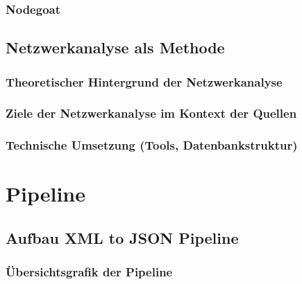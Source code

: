 \documentclass[12pt, a4paper, ngerman, bidi=default]{article}
\begin{document}
\subsubsection{Nodegoat}
\subsection{Netzwerkanalyse als Methode}
  \subsubsection{Theoretischer Hintergrund der Netzwerkanalyse}
  \subsubsection{Ziele der Netzwerkanalyse im Kontext der Quellen}
  \subsubsection{Technische Umsetzung (Tools, Datenbankstruktur)}



\section{Pipeline}

\subsection{Aufbau XML to JSON Pipeline}
\subsubsection{Übersichtsgrafik der Pipeline}


\vspace{6\baselineskip}
\end{document}
